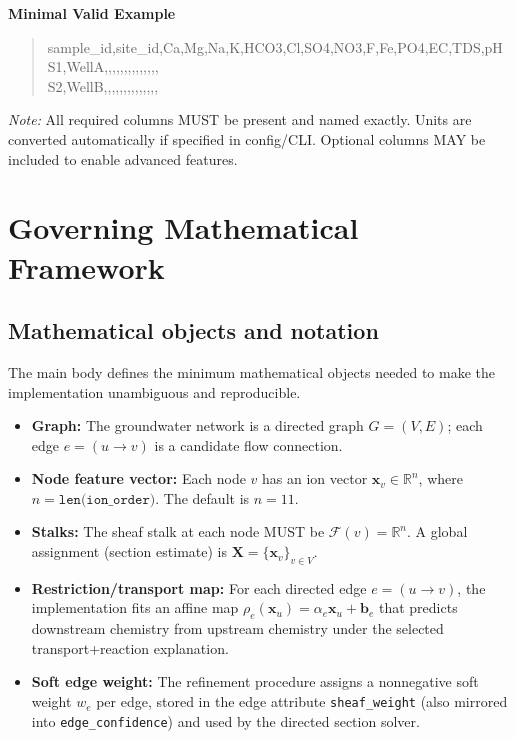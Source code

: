 \documentclass[12pt,a4paper]{article}
\theoremstyle{plain}
\theoremstyle{definition}
\theoremstyle{remark}
\begin{document}
\textbf{Minimal Valid Example}
\begin{quote}\ttfamily\small\raggedright
sample\_id,\allowbreak site\_id,\allowbreak Ca,\allowbreak Mg,\allowbreak Na,\allowbreak K,\allowbreak HCO3,\allowbreak Cl,\allowbreak SO4,\allowbreak NO3,\allowbreak F,\allowbreak Fe,\allowbreak PO4,\allowbreak EC,\allowbreak TDS,\allowbreak pH\\
S1,\allowbreak WellA,,,,,,,,,,,,,,\\
S2,\allowbreak WellB,,,,,,,,,,,,,,
\end{quote}

\textit{Note:} All required columns MUST be present and named exactly. Units are converted automatically if specified in config/CLI. Optional columns MAY be included to enable advanced features.

\section{Governing Mathematical Framework}\label{sec:math_framework}

\subsection{Mathematical objects and notation}\label{sec:notation}
The main body defines the minimum mathematical objects needed to make the implementation unambiguous and reproducible.
\begin{itemize}
	\item \textbf{Graph:} The groundwater network is a directed graph $G=(V,E)$; each edge $e=(u\to v)$ is a candidate flow connection.
	\item \textbf{Node feature vector:} Each node $v$ has an ion vector $\mathbf{x}_v\in\mathbb{R}^n$, where $n=\texttt{len(ion\_order)}$. The default is $n=11$.
	\item \textbf{Stalks:} The sheaf stalk at each node MUST be $\mathcal{F}(v)=\mathbb{R}^n$. A global assignment (section estimate) is $\mathbf{X}=\{\mathbf{x}_v\}_{v\in V}$.
	\item \textbf{Restriction/transport map:} For each directed edge $e=(u\to v)$, the implementation fits an affine map
	$\rho_e(\mathbf{x}_u)=\alpha_e\mathbf{x}_u+\mathbf{b}_e$ that predicts downstream chemistry from upstream chemistry under the selected transport+reaction explanation.
	\item \textbf{Soft edge weight:} The refinement procedure assigns a nonnegative soft weight $w_e$ per edge, stored in the edge attribute \texttt{sheaf\_\allowbreak weight} (also mirrored into \texttt{edge\_\allowbreak confidence}) and used by the directed section solver.
\end{itemize}
\end{document}
